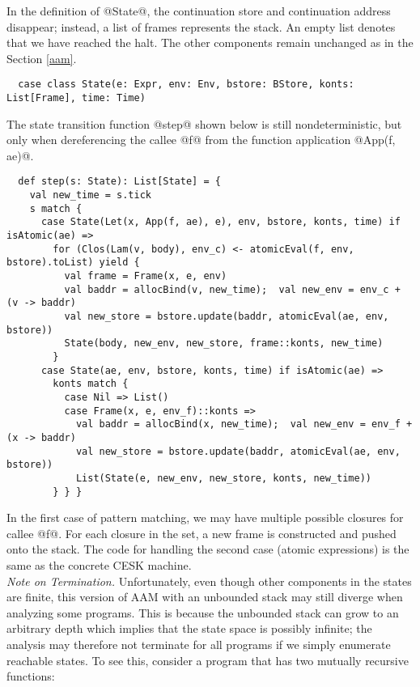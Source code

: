 \documentclass[acmsmall, screen]{acmart}\settopmatter{}
\begin{document}
In the definition of @State@, the continuation store and continuation address disappear;
instead, a list of frames represents the stack. An empty list denotes that we have reached
the halt. The other components remain unchanged as in the Section \ref{aam}.

\begin{lstlisting}
  case class State(e: Expr, env: Env, bstore: BStore, konts: List[Frame], time: Time)
\end{lstlisting}

The state transition function @step@ shown below is still
nondeterministic, but only when dereferencing the callee @f@ from the
function application @App(f, ae)@.

\begin{lstlisting}
  def step(s: State): List[State] = {
    val new_time = s.tick
    s match {
      case State(Let(x, App(f, ae), e), env, bstore, konts, time) if isAtomic(ae) =>
        for (Clos(Lam(v, body), env_c) <- atomicEval(f, env, bstore).toList) yield {
          val frame = Frame(x, e, env)
          val baddr = allocBind(v, new_time);  val new_env = env_c + (v -> baddr)
          val new_store = bstore.update(baddr, atomicEval(ae, env, bstore))
          State(body, new_env, new_store, frame::konts, new_time)
        }
      case State(ae, env, bstore, konts, time) if isAtomic(ae) =>
        konts match {
          case Nil => List()
          case Frame(x, e, env_f)::konts =>
            val baddr = allocBind(x, new_time);  val new_env = env_f + (x -> baddr)
            val new_store = bstore.update(baddr, atomicEval(ae, env, bstore))
            List(State(e, new_env, new_store, konts, new_time))
        } } }
\end{lstlisting}

In the first case of pattern matching, we may have multiple possible closures for callee @f@.
For each closure in the set, a new frame is constructed and pushed onto the stack.
The code for handling the second case (atomic expressions) is the same as the concrete CESK machine. \\

\textit{Note on Termination.}
Unfortunately, even though other components in the states are finite, this version of AAM with an unbounded
stack may still diverge when analyzing some programs.
This is because the unbounded stack can grow to an arbitrary depth which implies that the state
space is possibly infinite; the analysis may therefore not terminate for all programs if we
simply enumerate reachable states. To see this, consider a program that has two mutually
recursive functions:
\end{document}
